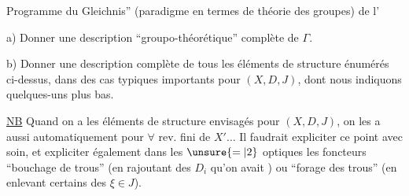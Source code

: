 Programme du   Gleichnis'' (paradigme en termes de théorie des groupes) de l'

a) Donner une description ``groupo-théorétique'' complète de $\Gamma$.

b) Donner une description complète de tous les éléments de structure énumérés ci-dessus, dans des cas typiques importants pour $(X,D,J)$, dont nous indiquons quelques-uns plus bas.


\uline{NB} Quand on a les éléments de structure envisagés pour $(X,D,J)$, on les a aussi automatiquement pour $\forall$ rev. fini de $X'\ldots$ Il faudrait expliciter ce point avec soin, et expliciter également dans les $\unsure{=|2}$ optiques les foncteurs ``bouchage de trous'' (en rajoutant  des $D_i$ qu'on avait ) ou ``forage des trous''  (en enlevant certains des $\xi\in J$).
